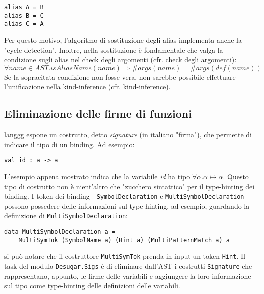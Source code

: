 \documentclass[10pt,a4paper]{article}
\begin{document}
\begin{lstlisting}
alias A = B
alias B = C
alias C = A
\end{lstlisting}

Per questo motivo, l'algoritmo di sostituzione degli alias implementa anche la "cycle detection". Inoltre, nella
sostituzione è fondamentale che valga la condizione sugli alias nel check degli argomenti (cfr. check degli argomenti):
    \[ \forall name \in AST. isAliasName(name) \Longrightarrow \#args(name) = \#args(def(name)) \]
Se la sopracitata condizione non fosse vera, non sarebbe possibile effettuare l'unificazione nella kind-inference (cfr.
kind-inference).

\subsection{Eliminazione delle firme di funzioni}
langgg espone un costrutto, detto \textit{signature} (in italiano "firma"), che permette di indicare il tipo di un
binding. Ad esempio:

\begin{lstlisting}
val id : a -> a
\end{lstlisting}

L'esempio appena mostrato indica che la variabile \textit{id} ha tipo $ \forall \alpha. \alpha \mapsto \alpha $. Questo
tipo di costrutto non è nient'altro che "zucchero sintattico" per il type-hinting dei binding. I token dei binding
- \texttt{SymbolDeclaration} e \texttt{MultiSymbolDeclaration} - possono possedere delle informazioni sul type-hinting,
ad esempio, guardando la definizione di \texttt{MultiSymbolDeclaration}:

\begin{lstlisting}
data MultiSymbolDeclaration a =
    MultiSymTok (SymbolName a) (Hint a) (MultiPatternMatch a) a
\end{lstlisting}

si può notare che il costruttore \texttt{MultiSymTok} prenda in input un token \texttt{Hint}. Il task del modulo
\texttt{Desugar.Sigs} è di eliminare dall'AST i costrutti \texttt{Signature} che rappresentano, appunto, le firme delle
variabili e aggiungere la loro informazione sul tipo come type-hinting delle definizioni delle variabili.
\end{document}
